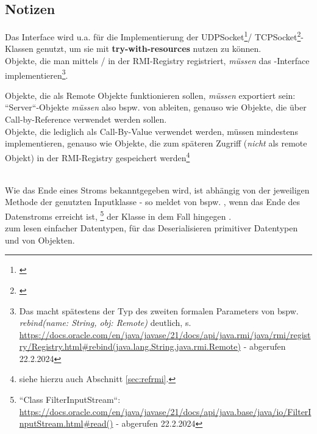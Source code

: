 \subsection{Notizen}
Das Interface  wird u.a. für die Implementierung der UDPSocket\footnote{\cite[269, Listing 5.1]{Oec22}}/ TCPSocket\footnote{\cite[286, Listing 5.7]{Oec22}}-Klassen genutzt, um sie mit \textbf{try-with-resources} nutzen zu können.\\

\noindent
Objekte, die man mittels /  in der RMI-Registry registriert, \textit{müssen} das -Interface implementieren\footnote{
Das macht spätestens der Typ des zweiten formalen Parameters von bspw. \textit{rebind(name: String, obj: Remote)} deutlich, s. \url{https://docs.oracle.com/en/java/javase/21/docs/api/java.rmi/java/rmi/registry/Registry.html#rebind(java.lang.String,java.rmi.Remote)} - abgerufen 22.2.2024
}.

\begin{tcolorbox}
Objekte, die als Remote Objekte funktionieren sollen, \textit{müssen} exportiert sein: ``Server``-Objekte \textit{müssen} also bspw. von  ableiten, genauso wie Objekte, die über Call-by-Reference verwendet werden sollen.\\

    \noindent
    Objekte, die lediglich als Call-By-Value verwendet werden, müssen mindestens  implementieren, genauso wie Objekte, die zum späteren Zugriff (\textit{nicht} als remote Objekt) in der RMI-Registry gespeichert werden\footnote{
        siehe hierzu auch Abschnitt \ref{sec:refrmi}.
}
\end{tcolorbox}\\

\noindent
Wie das Ende eines Stroms bekanntgegeben wird, ist abhängig von der jeweiligen Methode der genutzten Inputklasse - so meldet  von  bspw. , wenn das Ende des Datenstroms erreicht ist, \footnote{
    ``Class FilterInputStream``: \url{https://docs.oracle.com/en/java/javase/21/docs/api/java.base/java/io/FilterInputStream.html#read()} - abgerufen 22.2.2024
} der Klasse  in dem Fall hingegen .\\

\noindent
{} zum lesen einfacher Datentypen,  für das Deserialisieren primitiver Datentypen und von Objekten.\\

